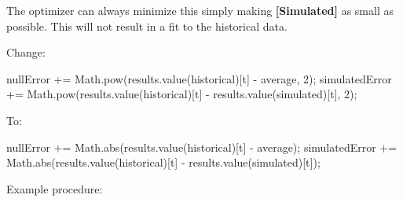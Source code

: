 \documentclass[]{memoir}
\newenvironment{Shaded}{}{}
\newcommand{\DecValTok}[1]{\textcolor[rgb]{0.25,0.63,0.44}{{#1}}}
\newcommand{\OtherTok}[1]{\textcolor[rgb]{0.00,0.44,0.13}{{#1}}}
\newcommand{\FunctionTok}[1]{\textcolor[rgb]{0.02,0.16,0.49}{{#1}}}
\newcommand{\NormalTok}[1]{{#1}}
\newcommand{\p}[1]{\textbf{{[}#1{]}}}
\begin{document}

The optimizer can always minimize this simply making \p{Simulated} as
small as possible. This will not result in a fit to the historical data.


Change:

\begin{Shaded}
\begin{Highlighting}[]
\NormalTok{nullError += }\OtherTok{Math}\NormalTok{.}\FunctionTok{pow}\NormalTok{(}\OtherTok{results}\NormalTok{.}\FunctionTok{value}\NormalTok{(historical)[t] - average, }\DecValTok{2}\NormalTok{);}
\NormalTok{simulatedError += }\OtherTok{Math}\NormalTok{.}\FunctionTok{pow}\NormalTok{(}\OtherTok{results}\NormalTok{.}\FunctionTok{value}\NormalTok{(historical)[t] - }\OtherTok{results}\NormalTok{.}\FunctionTok{value}\NormalTok{(simulated)[t], }\DecValTok{2}\NormalTok{);}
\end{Highlighting}
\end{Shaded}

To:

\begin{Shaded}
\begin{Highlighting}[]
\NormalTok{nullError += }\OtherTok{Math}\NormalTok{.}\FunctionTok{abs}\NormalTok{(}\OtherTok{results}\NormalTok{.}\FunctionTok{value}\NormalTok{(historical)[t] - average);}
\NormalTok{simulatedError += }\OtherTok{Math}\NormalTok{.}\FunctionTok{abs}\NormalTok{(}\OtherTok{results}\NormalTok{.}\FunctionTok{value}\NormalTok{(historical)[t] - }\OtherTok{results}\NormalTok{.}\FunctionTok{value}\NormalTok{(simulated)[t]);}
\end{Highlighting}
\end{Shaded}


Example procedure:
\end{document}

